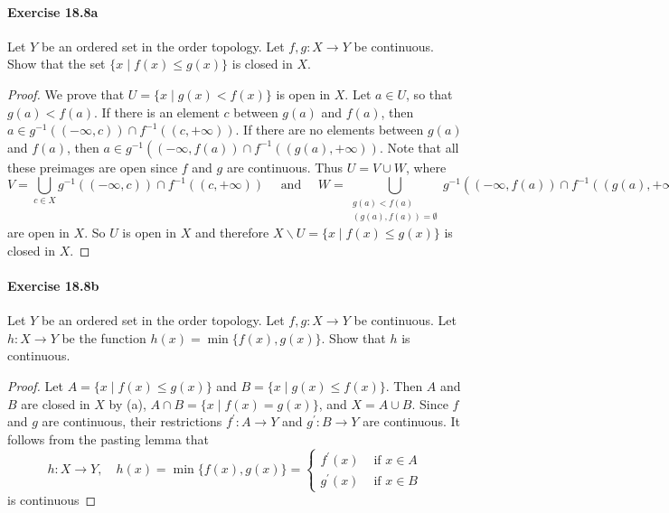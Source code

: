 \documentclass{article}
\begin{document}
\paragraph{Exercise 18.8a} Let $Y$ be an ordered set in the order topology. Let $f, g: X \rightarrow Y$ be continuous. Show that the set $\{x \mid f(x) \leq g(x)\}$ is closed in $X$.
\begin{proof}
    We prove that $U=\{x \mid g(x)<f(x)\}$ is open in $X$. Let $a \in U$, so that $g(a)<f(a)$. If there is an element $c$ between $g(a)$ and $f(a)$, then $a \in g^{-1}((-\infty, c)) \cap f^{-1}((c,+\infty))$. If there are no elements between $g(a)$ and $f(a)$, then $a \in g^{-1}\left((-\infty, f(a)) \cap f^{-1}((g(a),+\infty))\right.$. Note that all these preimages are open since $f$ and $g$ are continuous. Thus $U=V \cup W$, where
$$
V=\bigcup_{c \in X} g^{-1}((-\infty, c)) \cap f^{-1}((c,+\infty)) \quad \text { and } \quad W=\bigcup_{\substack{g(a)<f(a) \\(g(a), f(a))=\emptyset}} g^{-1}\left((-\infty, f(a)) \cap f^{-1}((g(a),+\infty))\right.
$$
are open in $X$. So $U$ is open in $X$ and therefore $X \backslash U=\{x \mid f(x) \leq g(x)\}$ is closed in $X$.
\end{proof}



\paragraph{Exercise 18.8b} Let $Y$ be an ordered set in the order topology. Let $f, g: X \rightarrow Y$ be continuous. Let $h: X \rightarrow Y$ be the function $h(x)=\min \{f(x), g(x)\}.$ Show that $h$ is continuous.
\begin{proof}
    Let $A=\{x \mid f(x) \leq g(x)\}$ and $B=\{x \mid g(x) \leq f(x)\}$. Then $A$ and $B$ are closed in $X$ by (a), $A \cap B=\{x \mid f(x)=g(x)\}$, and $X=A \cup B$. Since $f$ and $g$ are continuous, their restrictions $f^{\prime}: A \rightarrow Y$ and $g^{\prime}: B \rightarrow Y$ are continuous. It follows from the pasting lemma that
$$
h: X \rightarrow Y, \quad h(x)=\min \{f(x), g(x)\}= \begin{cases}f^{\prime}(x) & \text { if } x \in A \\ g^{\prime}(x) & \text { if } x \in B\end{cases}
$$
is continuous
\end{proof}
\end{document}
